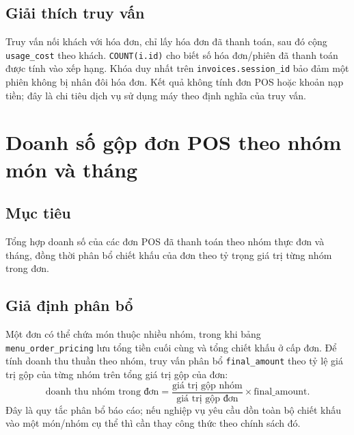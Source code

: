 \subsection*{Giải thích truy vấn}
Truy vấn nối khách với hóa đơn, chỉ lấy hóa đơn đã thanh toán, sau đó cộng \texttt{usage\_cost} theo khách. \texttt{COUNT(i.id)} cho biết số hóa đơn/phiên đã thanh toán được tính vào xếp hạng. Khóa duy nhất trên \texttt{invoices.session\_id} bảo đảm một phiên không bị nhân đôi hóa đơn. Kết quả không tính đơn POS hoặc khoản nạp tiền; đây là chi tiêu dịch vụ sử dụng máy theo định nghĩa của truy vấn.

\section{Doanh số gộp đơn POS theo nhóm món và tháng}
\subsection*{Mục tiêu}
Tổng hợp doanh số của các đơn POS đã thanh toán theo nhóm thực đơn và tháng, đồng thời phân bổ chiết khấu của đơn theo tỷ trọng giá trị từng nhóm trong đơn.

\subsection*{Giả định phân bổ}
Một đơn có thể chứa món thuộc nhiều nhóm, trong khi bảng \texttt{menu\_order\_pricing} lưu tổng tiền cuối cùng và tổng chiết khấu ở cấp đơn. Để tính doanh thu thuần theo nhóm, truy vấn phân bổ \texttt{final\_amount} theo tỷ lệ giá trị gộp của từng nhóm trên tổng giá trị gộp của đơn:
\[
\text{doanh thu nhóm trong đơn}
=\frac{\text{giá trị gộp nhóm}}{\text{giá trị gộp đơn}}\times\text{final\_amount}.
\]
Đây là quy tắc phân bổ báo cáo; nếu nghiệp vụ yêu cầu dồn toàn bộ chiết khấu vào một món/nhóm cụ thể thì cần thay công thức theo chính sách đó.

